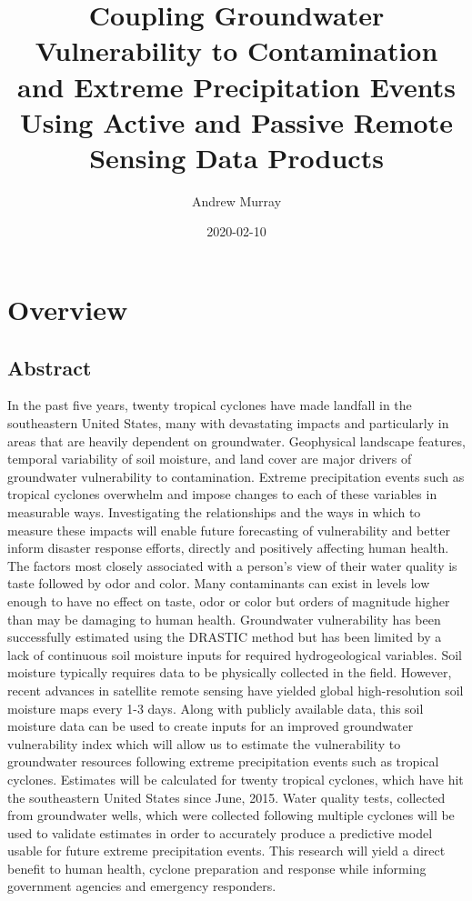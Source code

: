 \documentclass[
]{book}
\title{Coupling Groundwater Vulnerability to Contamination and Extreme Precipitation Events Using Active and Passive Remote Sensing Data Products}
\author{Andrew Murray}
\date{2020-02-10}
\begin{document}
\maketitle

{
\setcounter{tocdepth}{1}
\tableofcontents
}
\hypertarget{overview}{%
\chapter{Overview}\label{overview}}

\hypertarget{abstract}{%
\section{Abstract}\label{abstract}}

In the past five years, twenty tropical cyclones have made landfall in the southeastern United States, many with devastating impacts and particularly in areas that are heavily dependent on groundwater. Geophysical landscape features, temporal variability of soil moisture, and land cover are major drivers of groundwater vulnerability to contamination. Extreme precipitation events such as tropical cyclones overwhelm and impose changes to each of these variables in measurable ways. Investigating the relationships and the ways in which to measure these impacts will enable future forecasting of vulnerability and better inform disaster response efforts, directly and positively affecting human health.
The factors most closely associated with a person's view of their water quality is taste followed by odor and color. Many contaminants can exist in levels low enough to have no effect on taste, odor or color but orders of magnitude higher than may be damaging to human health. Groundwater vulnerability has been successfully estimated using the DRASTIC method but has been limited by a lack of continuous soil moisture inputs for required hydrogeological variables. Soil moisture typically requires data to be physically collected in the field. However, recent advances in satellite remote sensing have yielded global high-resolution soil moisture maps every 1-3 days. Along with publicly available data, this soil moisture data can be used to create inputs for an improved groundwater vulnerability index which will allow us to estimate the vulnerability to groundwater resources following extreme precipitation events such as tropical cyclones. Estimates will be calculated for twenty tropical cyclones, which have hit the southeastern United States since June, 2015. Water quality tests, collected from groundwater wells, which were collected following multiple cyclones will be used to validate estimates in order to accurately produce a predictive model usable for future extreme precipitation events. This research will yield a direct benefit to human health, cyclone preparation and response while informing government agencies and emergency responders.
\end{document}
